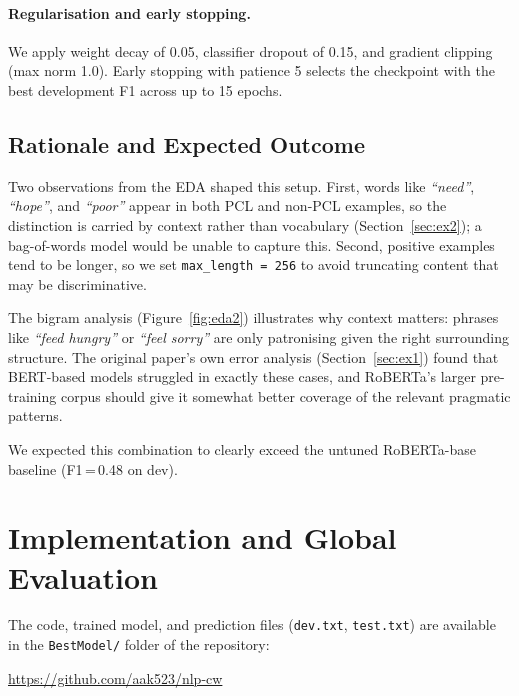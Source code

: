 \documentclass[11pt,a4paper]{article}
\begin{document}
\paragraph{Regularisation and early stopping.}
We apply weight decay of 0.05, classifier dropout of 0.15, and gradient clipping (max norm 1.0). Early stopping with patience 5 selects the checkpoint with the best development F1 across up to 15 epochs.

\subsection*{Rationale and Expected Outcome}

Two observations from the EDA shaped this setup. First, words like \textit{``need''}, \textit{``hope''}, and \textit{``poor''} appear in both PCL and non-PCL examples, so the distinction is carried by context rather than vocabulary (Section~\ref{sec:ex2}); a bag-of-words model would be unable to capture this. Second, positive examples tend to be longer, so we set \texttt{max\_length\,=\,256} to avoid truncating content that may be discriminative.

The bigram analysis (Figure~\ref{fig:eda2}) illustrates why context matters: phrases like \textit{``feed hungry''} or \textit{``feel sorry''} are only patronising given the right surrounding structure. The original paper's own error analysis (Section~\ref{sec:ex1}) found that BERT-based models struggled in exactly these cases, and RoBERTa's larger pre-training corpus should give it somewhat better coverage of the relevant pragmatic patterns.

We expected this combination to clearly exceed the untuned RoBERTa-base baseline (F1\,=\,0.48 on dev).

\section{Implementation and Global Evaluation}
\label{sec:ex4-51}

The code, trained model, and prediction files (\texttt{dev.txt},
\texttt{test.txt}) are available in the \texttt{BestModel/} folder of the
repository:

\begin{center}
    \url{https://github.com/aak523/nlp-cw}
\end{center}
\end{document}
